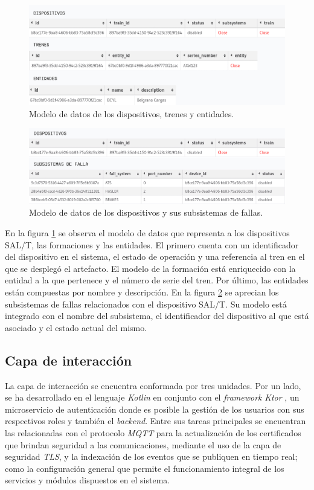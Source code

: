 \begin{figure}[ht]
\centering 
\includegraphics[width=.5\textwidth]{images/v2.1.0/device_train_entity.jpg}
\caption{Modelo de datos de los dispositivos, trenes y entidades.}
\label{fig:devicesTrainEntity}
\end{figure}

\begin{figure}[ht]
\centering 
\includegraphics[width=.5\textwidth]{images/v2.1.0/device_fail_system.jpg}
\caption{Modelo de datos de los dispositivos y sus subsistemas de fallas.}
\label{fig:devicesSubsystems}
\end{figure}

En la figura \ref{fig:devicesTrainEntity} se observa el modelo de datos que representa a los dispositivos SAL/T, las formaciones y las entidades. 
El primero cuenta con un identificador del dispositivo en el sistema, el estado de operación y una referencia al tren en el que se desplegó el artefacto. 
El modelo de la formación está enriquecido con la entidad a la que pertenece y el número de serie del tren. 
Por último, las entidades están compuestas por nombre y descripción.
En la figura \ref{fig:devicesSubsystems} se aprecian los subsistemas de fallas relacionados con el dispositivo SAL/T.
  Su modelo está integrado con el nombre del subsistema, el identificador del dispositivo al que está asociado y el estado actual del mismo. 

\subsection{Capa de interacción}

La capa de interacción se encuentra conformada por tres unidades. Por un lado, se ha desarrollado en el lenguaje \textit{Kotlin} \cite{b14} en conjunto con el \textit{framework} \textit{Ktor} \cite{b15}, un microservicio de autenticación donde es posible la gestión de los usuarios con sus respectivos roles y también el \textit{backend}. Entre sus tareas principales se encuentran las relacionadas con el protocolo \textit{MQTT} para la actualización de los certificados que brindan seguridad a las comunicaciones, mediante el uso de la capa de seguridad \textit{TLS}, y la indexación de los eventos que se publiquen en tiempo real; como la configuración general que permite el funcionamiento integral de los servicios y módulos dispuestos en el sistema. \\

